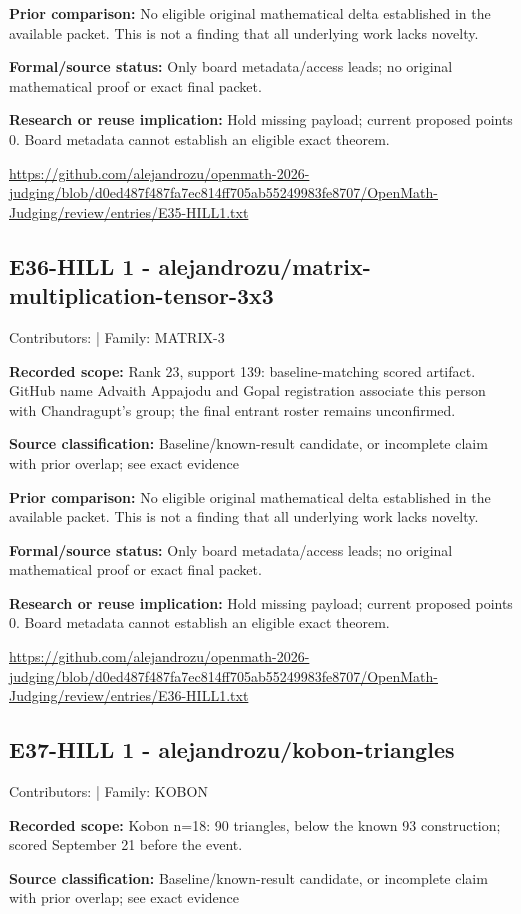 \documentclass[11pt,a4paper]{article}
\begin{document}
\textbf{Prior comparison:} No eligible original mathematical delta established in the available packet. This is not a finding that all underlying work lacks novelty.

\textbf{Formal/source status:} Only board metadata/access leads; no original mathematical proof or exact final packet. 

\textbf{Research or reuse implication:} Hold missing payload; current proposed points 0. Board metadata cannot establish an eligible exact theorem.

{\small \url{https://github.com/alejandrozu/openmath-2026-judging/blob/d0ed487f487fa7ec814ff705ab55249983fe8707/OpenMath-Judging/review/entries/E35-HILL1.txt}\par}

\begin{samepage}
\subsection{E36-HILL 1  -  alejandrozu/matrix-multiplication-tensor-3x3}
{\small Contributors:  | Family: MATRIX-3\par}

\textbf{Recorded scope:} Rank 23, support 139: baseline-matching scored artifact. GitHub name Advaith Appajodu and Gopal registration associate this person with Chandragupt's group; the final entrant roster remains unconfirmed.

\end{samepage}
\textbf{Source classification:} Baseline/known-result candidate, or incomplete claim with prior overlap; see exact evidence

\textbf{Prior comparison:} No eligible original mathematical delta established in the available packet. This is not a finding that all underlying work lacks novelty.

\textbf{Formal/source status:} Only board metadata/access leads; no original mathematical proof or exact final packet. 

\textbf{Research or reuse implication:} Hold missing payload; current proposed points 0. Board metadata cannot establish an eligible exact theorem.

{\small \url{https://github.com/alejandrozu/openmath-2026-judging/blob/d0ed487f487fa7ec814ff705ab55249983fe8707/OpenMath-Judging/review/entries/E36-HILL1.txt}\par}

\begin{samepage}
\subsection{E37-HILL 1  -  alejandrozu/kobon-triangles}
{\small Contributors:  | Family: KOBON\par}

\textbf{Recorded scope:} Kobon n=18: 90 triangles, below the known 93 construction; scored September 21 before the event.

\end{samepage}
\textbf{Source classification:} Baseline/known-result candidate, or incomplete claim with prior overlap; see exact evidence
\end{document}
